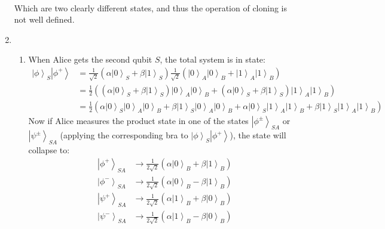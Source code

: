 \documentclass[12pt,a4]{article}
\begin{document}
\begin{enumerate}
\begin{align*}
    \end{align*}
    Which are two clearly different states, and thus the operation of cloning is not well defined.
  \item
    \begin{enumerate}
      \item
        When Alice gets the second qubit $S$, the total system is in state:
        \begin{align*}
          \left|\phi\right\rangle_S \left|\phi^+\right\rangle &= \frac{1}{\sqrt{2}}\left(\alpha\left| 0\right\rangle_S + \beta\left| 1\right \rangle_S\right)\frac{1}{\sqrt{2}}\left(\left| 0\right\rangle_A\left| 0 \right \rangle_B + \left| 1\right\rangle_A\left| 1 \right \rangle_B\right)\\
                                                              &= \frac{1}{2}\left(\left(\alpha\left| 0\right\rangle_S + \beta\left| 1\right \rangle_S\right)\left| 0\right\rangle_A\left| 0 \right \rangle_B + \left(\alpha\left| 0\right\rangle_S + \beta\left| 1\right \rangle_S\right)\left| 1\right\rangle_A\left| 1 \right \rangle_B\right)\\
                                                              &= \frac{1}{2}\left(\alpha\left| 0\right\rangle_S \left| 0\right\rangle_A\left| 0 \right \rangle_B + \beta\left| 1\right \rangle_S\left| 0\right\rangle_A\left| 0 \right \rangle_B + \alpha\left| 0\right\rangle_S\left| 1\right\rangle_A\left| 1 \right \rangle_B + \beta\left| 1\right \rangle_S\left| 1\right\rangle_A\left| 1 \right \rangle_B\right)
        \end{align*}
        Now if Alice measures the product state in one of the states $\left|\phi^{\pm}\right\rangle_{SA}$ or $\left|\psi^{\pm}\right\rangle_{SA}$ (applying the corresponding bra to $\left|\phi\right\rangle_S \left|\phi^+\right\rangle$), the state will collapse to:
        \begin{align}
          \left|\phi^{+}\right\rangle_{SA} &\to \frac{1}{2 \sqrt{2}}\left(\alpha \left| 0 \right\rangle_B + \beta \left|1 \right \rangle_B\right) \label{eq:aliceCase1}\\
          \left|\phi^{-}\right\rangle_{SA} &\to \frac{1}{2 \sqrt{2}}\left(\alpha \left| 0 \right\rangle_B - \beta \left|1 \right \rangle_B\right) \label{eq:aliceCase2}\\
          \left|\psi^{+}\right\rangle_{SA} &\to \frac{1}{2 \sqrt{2}}\left(\alpha \left| 1 \right\rangle_B + \beta \left|0 \right \rangle_B\right) \label{eq:aliceCase3}\\
          \left|\psi^{-}\right\rangle_{SA} &\to \frac{1}{2 \sqrt{2}}\left(\alpha \left| 1 \right\rangle_B - \beta \left|0 \right \rangle_B\right) \label{eq:aliceCase4}

\end{align}
\end{enumerate}
\end{enumerate}
\end{document}
